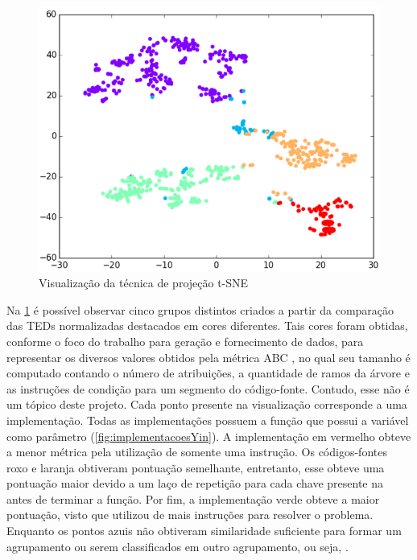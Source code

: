 		\begin{figure}[ht]
			\centering
			\includegraphics[scale=0.5]{imagem/visualizacao-tSNE.png}
			\caption[Visualização da técnica de projeção t-SNE]{Visualização da técnica de projeção t-SNE \cite{Yin:2015}}
			\label{fig:t-SNE}
		\end{figure}

		Na \cref{fig:t-SNE} é possível observar cinco grupos distintos criados a
		partir da comparação das TEDs normalizadas destacados em cores diferentes.
		Tais cores foram obtidas, conforme o foco do trabalho para geração e fornecimento
		de dados, para representar os diversos valores obtidos pela métrica ABC
		\cite{fitzpatrick1997applying}, no qual seu tamanho é computado contando o
		número de atribuições, a quantidade de ramos da árvore e as instruções de
		condição para um segmento do código-fonte. Contudo, esse não é um tópico  %
		deste projeto. Cada ponto presente na visualização corresponde a uma implementação.
		Todas as implementações possuem a função  que possui a
		variável  como parâmetro (\cref{fig:implementacoesYin}). A
		implementação em vermelho obteve a menor métrica pela utilização de somente
		uma instrução. Os códigos-fontes roxo e laranja obtiveram pontuação semelhante,
		entretanto, esse obteve uma pontuação maior devido a um laço de repetição para
		cada chave presente na  antes de terminar a função. Por fim, a
		implementação verde obteve a maior pontuação, visto que utilizou de mais instruções
		para resolver o problema. Enquanto os pontos azuis não obtiveram similaridade
		suficiente para formar um agrupamento ou serem classificados em outro agrupamento,
		ou seja, .

